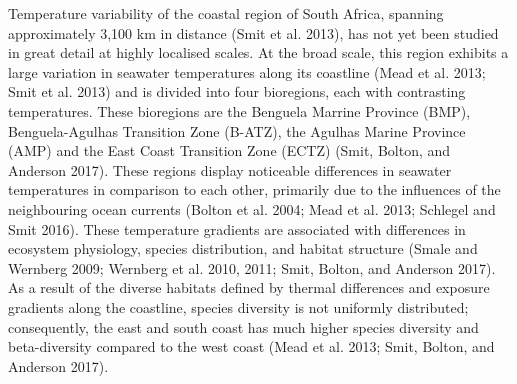 \documentclass[12pt,a4paper,]{article}
\begin{document}
Temperature variability of the coastal region of South Africa, spanning
approximately 3,100 km in distance (Smit et al. 2013), has not yet been
studied in great detail at highly localised scales. At the broad scale,
this region exhibits a large variation in seawater temperatures along
its coastline (Mead et al. 2013; Smit et al. 2013) and is divided into
four bioregions, each with contrasting temperatures. These bioregions
are the Benguela Marrine Province (BMP), Benguela-Agulhas Transition
Zone (B-ATZ), the Agulhas Marine Province (AMP) and the East Coast
Transition Zone (ECTZ) (Smit, Bolton, and Anderson 2017). These regions
display noticeable differences in seawater temperatures in comparison to
each other, primarily due to the influences of the neighbouring ocean
currents (Bolton et al. 2004; Mead et al. 2013; Schlegel and Smit 2016).
These temperature gradients are associated with differences in ecosystem
physiology, species distribution, and habitat structure (Smale and
Wernberg 2009; Wernberg et al. 2010, 2011; Smit, Bolton, and Anderson
2017). As a result of the diverse habitats defined by thermal
differences and exposure gradients along the coastline, species
diversity is not uniformly distributed; consequently, the east and south
coast has much higher species diversity and beta-diversity compared to
the west coast (Mead et al. 2013; Smit, Bolton, and Anderson 2017).
\end{document}
